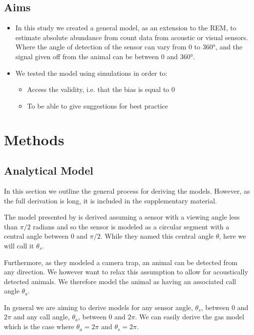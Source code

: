 \documentclass[a4paper,10pt,reqno,oneside]{amsart}
\begin{document}
\subsection{Aims}

\begin{itemize}
\item  In this study we created a general model, as an extension to the REM, to estimate absolute abundance from count data from acoustic or visual sensors. Where the angle of detection of the sensor can vary from 0 to 360°, and the signal given off from the animal can be between 0 and 360°.
\item  We tested the model using simulations in order to:
\begin{itemize}
\item Access the validity, i.e. that the bias is equal to 0
\item  To be able to give suggestions for best practice
\end{itemize}
\end{itemize}


\section{Methods}

\subsection{Analytical Model}

In this section we outline the general process for deriving the models. However, as the full derivation is long, it is included in the supplementary material.

The model presented by \citep{rowcliffe2008estimating} is derived assuming a sensor with a viewing angle less than 
$\pi/2$ radians and so the sensor is modeled as a circular segment with a central angle between 0 and  $\pi/2$. While they named this central angle $\theta$, here we will call it $\theta_s$.

Furthermore, as they modeled a camera trap, an animal can be detected from any direction. We however want to relax this assumption to allow for acoustically detected animals. We therefore model the animal as having an associated call angle $\theta_a$.

In general we are aiming to derive models for any sensor angle, $ \theta_s$, between 0 and $2\pi$ and any call angle, $ \theta_a$, between 0 and $2\pi$. We can easily derive the gas model which is the case where $ \theta_a =  2\pi$ and $ \theta_s =  2\pi$.
\end{document}
